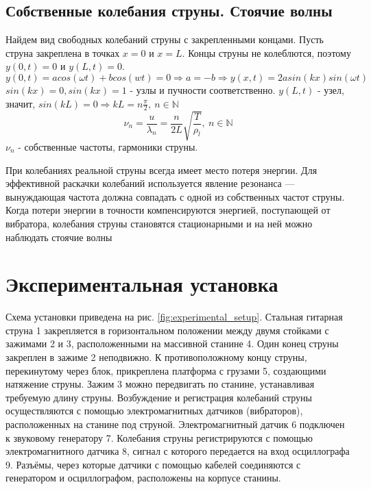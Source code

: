\documentclass[a4paper, 12pt]{article}
\begin{document}
\subsection{Собственные колебания струны. Стоячие волны}

Найдем вид свободных колебаний струны с закрепленными концами. Пусть струна закреплена в точках \(x = 0\) и \(x = L\). Концы струны не колеблются, поэтому \(y(0,t) = 0\) и \(y(L,t) = 0\).
\[y(0,t) =  acos(\omega t) + bcos(wt) = 0 \Rightarrow a=-b \Rightarrow y(x,t) = 2asin(kx)sin(\omega t)\]
\(sin(kx) = 0, sin(kx) = 1\) - узлы и пучности соответственно. \(y(L,t)\) - узел, значит, \(sin(kL) = 0 \Rightarrow kL = n\frac{\pi}{2}, \ n \in \mathbb{N}\)
\begin{equation}
    \label{nu_n}
    \nu_n = \frac{u}{\lambda_n} = \frac{n}{2L}\sqrt{\frac{T}{\rho_l}},  \ n \in \mathbb{N}
\end{equation}
\(\nu_n\) - собственные частоты, гармоники струны.

При колебаниях реальной струны всегда имеет место потеря энергии. Для эффективной раскачки колебаний используется явление резонанса — вынуждающая частота должна совпадать с одной из собственных частот струны. Когда потери энергии в точности компенсируются энергией, поступающей от вибратора, колебания струны становятся стационарными и на ней можно наблюдать стоячие волны
\newpage
\section{Экспериментальная установка}

Схема установки приведена на рис. \ref{fig:experimental_setup}. Стальная гитарная струна 1 закрепляется в горизонтальном положении между двумя стойками с зажимами 2 и 3, расположенными на массивной станине 4. Один конец струны закреплен в зажиме 2 неподвижно. К противоположному концу струны, перекинутому через блок, прикреплена платформа с грузами 5, создающими натяжение струны. Зажим 3 можно передвигать по станине, устанавливая требуемую длину струны. Возбуждение и регистрация колебаний струны осуществляются с помощью электромагнитных датчиков (вибраторов), расположенных на станине под струной. Электромагнитный датчик 6 подключен к звуковому генератору 7. Колебания струны регистрируются с помощью электромагнитного датчика 8, сигнал с которого передается на вход осциллографа 9. Разъёмы, через которые датчики с помощью кабелей соединяются с генератором и осциллографом, расположены на корпусе станины.
\end{document}
